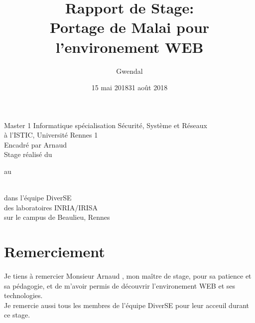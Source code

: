 \documentclass[11pt, a4paper, pdftex]{article}
\begin{document}
    \title{Rapport de Stage: \\ Portage de Malai pour l'environement WEB}
    \author{Gwendal }

    \maketitle
    \thispagestyle{empty}
    \begin{center}
        \vspace{0.25cm} Master 1 Informatique spécialisation Sécurité, Système et Réseaux \\ à l'ISTIC, Université Rennes 1 \\
        \vspace{0.25cm} Encadré par Arnaud  \\
        \vspace{0.25cm} Stage réalisé du \date{15 mai 2018} au \date{31 août 2018} \\ \vspace{0.25cm} dans l'équipe DiverSE \\ des laboratoires INRIA/IRISA \\ sur le campus de Beaulieu, Rennes
    \end{center}


    \newpage
    \setcounter{page}{1}
    \pagestyle{fancy}
    \renewcommand{\headrulewidth}{1pt}
    \fancyhead[C]{\leftmark}
    \fancyfoot[C]{\thepage/\pageref{LastPage}}
    \section*{Remerciement}\label{sec:remerciement}
    \paragraph{}
    Je tiens à remercier Monsieur Arnaud , mon maître de stage, pour sa patience et sa pédagogie, et de m'avoir permis de découvrir l'environement WEB et ses technologies. \\
    Je remercie aussi tous les membres de l'équipe DiverSE pour leur acceuil durant ce stage.
    \newpage
\end{document}
